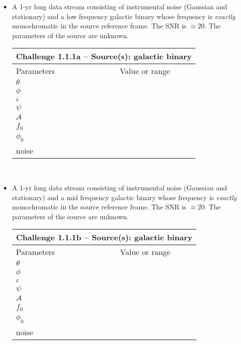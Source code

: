 \documentclass[11pt]{report}
\begin{document}
\begin{itemize}
\item A 1-yr long data stream consisting of instrumental noise (Gaussian and stationary) and a low frequency galactic binary whose frequency is {\em exactly} monochromatic in the source reference frame. The SNR is $\approx 20$. The parameters of the source are unknown.

\begin{center}
\begin{tabular}{l|c}
\hline \hline
\multicolumn{2}{c}{{\bf Challenge 1.1.1a -- Source(s): galactic binary}} \\
\hline
Parameters & Value or range \\
\hline
$\theta$ & \\
$\phi$   & \\ 
$\iota$  & \\ 
$\psi$   & \\
${\cal A}$ & \\
$f_0$    & \\ 
$\phi_0$ & \\
noise    & \\
\hline \hline
\end{tabular} \\
\end{center}


\item A 1-yr long data stream consisting of instrumental noise (Gaussian and stationary) and a mid frequency galactic binary whose frequency is {\em exactly} monochromatic in the source reference frame. The SNR is $\approx 20$. The parameters of the source are unknown.

\begin{center}
\begin{tabular}{l|c}
\hline \hline
\multicolumn{2}{c}{{\bf Challenge 1.1.1b -- Source(s): galactic binary}} \\
\hline
Parameters & Value or range \\
\hline
$\theta$ & \\
$\phi$   & \\ 
$\iota$  & \\ 
$\psi$   & \\
${\cal A}$ & \\
$f_0$    & \\ 
$\phi_0$ & \\
noise    & \\
\hline \hline
\end{tabular} \\
\end{center}



\end{itemize}
\end{document}
